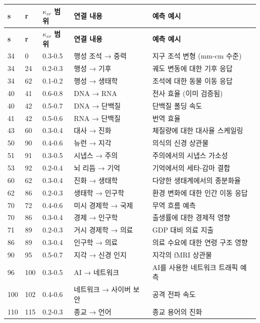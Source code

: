 \documentclass[13pt,a4paper]{article}
\begin{document}
	\begin{longtable}{|p{1cm}|p{1cm}|p{2.5cm}|p{4cm}|p{3cm}|}
		\hline
		\textbf{s} & \textbf{r} & \textbf{$\kappa_{sr}$ 범위} & \textbf{연결 내용} & \textbf{예측 예시} \\
		\hline
		\endfirsthead
		\hline
		\textbf{s} & \textbf{r} & \textbf{$\kappa_{sr}$ 범위} & \textbf{연결 내용} & \textbf{예측 예시} \\
		\hline
		\endhead
		
		34 & 0 & 0.3-0.5 & 행성 조석 → 중력 & 지구 조석 변형 (mm-cm 수준) \\
		34 & 24 & 0.2-0.3 & 행성 → 기후 & 궤도 변동에 대한 기후 응답 \\
		34 & 62 & 0.1-0.2 & 행성 → 생태학 & 조석에 대한 동물 이동 응답 \\
		40 & 41 & 0.6-0.8 & DNA → RNA & 전사 효율 (이미 검증됨) \\
		40 & 42 & 0.5-0.7 & DNA → 단백질 & 단백질 폴딩 속도 \\
		41 & 42 & 0.5-0.6 & RNA → 단백질 & 번역 효율 \\
		43 & 60 & 0.3-0.4 & 대사 → 진화 & 체질량에 대한 대사율 스케일링 \\
		50 & 90 & 0.4-0.6 & 뉴런 → 지각 & 의식의 신경 상관물 \\
		51 & 91 & 0.3-0.5 & 시냅스 → 주의 & 주의에서의 시냅스 가소성 \\
		53 & 92 & 0.2-0.4 & 뇌 리듬 → 기억 & 기억에서의 세타-감마 결합 \\
		60 & 62 & 0.3-0.4 & 진화 → 생태학 & 다양한 생태계에서의 종분화율 \\
		62 & 86 & 0.2-0.3 & 생태학 → 인구학 & 환경 변화에 대한 인간 이동 응답 \\
		70 & 72 & 0.4-0.6 & 미시 경제학 → 국제 & 무역 흐름 예측 \\
		70 & 86 & 0.3-0.4 & 경제 → 인구학 & 출생률에 대한 경제적 영향 \\
		71 & 89 & 0.2-0.3 & 거시 경제학 → 의료 & GDP 대비 의료 지출 \\
		86 & 89 & 0.3-0.4 & 인구학 → 의료 & 의료 수요에 대한 연령 구조 영향 \\
		90 & 95 & 0.5-0.7 & 지각 → 신경 인지 & 지각의 fMRI 상관물 \\
		96 & 100 & 0.3-0.5 & AI → 네트워크 & AI를 사용한 네트워크 트래픽 예측 \\
		100 & 102 & 0.4-0.6 & 네트워크 → 사이버 보안 & 공격 전파 속도 \\
		110 & 115 & 0.2-0.3 & 종교 → 언어 & 종교 용어의 진화 \\
		\hline
	\end{longtable}
	
\end{document}
